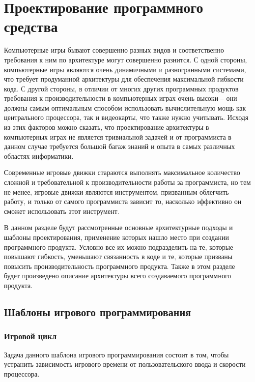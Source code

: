 \section{Проектирование программного средства}

Компьютерные игры бывают совершенно разных видов и соответственно требования к ним по архитектуре могут совершенно разнится. С одной стороны, компьютерные игры являются очень динамичными и разногранными системами, что требует продуманной архитектуры для обеспечения максимальной гибкости кода. С другой стороны, в отличии от многих других программных продуктов требования к производительности в компьютерных играх очень высоки -- они должны самым оптимальным способом использовать вычислительную мощь как центрального процессора, так и видеокарты, что также нужно учитывать. Исходя из этих факторов можно сказать, что проектирование архитектуры в компьютерных играх не является тривиальной задачей и от программиста в данном случае требуется большой багаж знаний и опыта в самых различных областях информатики.

Современные игровые движки стараются выполнять максимальное количество сложной и требовательной к производительности работы за программиста, но тем не менее, игровые движки являются инструментом, призванным облегчить работу, и только от самого программиста зависит то, насколько эффективно он сможет использовать этот инструмент.

В данном разделе будут рассмотренные основные архитектурные подходы и шаблоны проектирования, применение которых нашло место при создании программного продукта. Условно все их можно подразделить на те, которые повышают гибкость, уменьшают связанность в коде и те, которые призваны повысить производительность программного продукта. Также в этом разделе будет произведено описание архитектуры всего создаваемого программного продукта.


\subsection{Шаблоны игрового программирования}


\subsubsection{Игровой цикл}

Задача данного шаблона игрового программирования состоит в том, чтобы устранить зависимость игрового времени от пользовательского ввода и скорости процессора.

